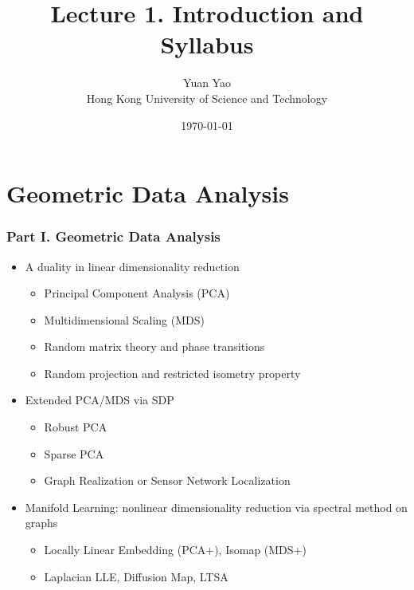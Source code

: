 \documentclass[10pt,mathserif]{beamer}
\title{\large \bfseries Lecture 1. Introduction and Syllabus}
\author{Yuan Yao\\[3ex]
Hong Kong University of Science and Technology}
\date{\today}
\begin{document}
\frame{
\thispagestyle{empty}
\titlepage
}

\section{Geometric Data Analysis}

\begin{frame}
\frametitle{Part I. Geometric Data Analysis}
\begin{itemize}\itemsep=12pt
\item A duality in linear dimensionality reduction
\vspace*{0.5em}
\begin{itemize}
\item Principal Component Analysis (PCA)
\item Multidimensional Scaling (MDS)
\item Random matrix theory and phase transitions
\item Random projection and restricted isometry property
\end{itemize}
\vspace*{0.5em}
\item Extended PCA/MDS via SDP
\vspace*{0.5em}
\begin{itemize}
\item Robust PCA
\item Sparse PCA
\item Graph Realization or Sensor Network Localization
\end{itemize}
\item Manifold Learning: nonlinear dimensionality reduction via spectral method on graphs
\vspace*{0.5em}
\begin{itemize}
\item Locally Linear Embedding (PCA+), Isomap (MDS+)
\item Laplacian LLE, Diffusion Map, LTSA
\end{itemize}
\end{itemize}
\end{frame}
\end{document}
